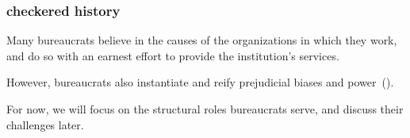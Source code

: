 \documentclass[presentation]{subfiles}
\begin{document}
\begin{frame}\frametitle{checkered history}



Many bureaucrats believe in the causes of the organizations in which they work, and
do so with an earnest effort to provide the institution's services.

However, bureaucrats also instantiate and reify prejudicial biases and power~(\cite{corbett2017algorithmic}).

For now, we will focus on the structural roles bureaucrats serve, and discuss their challenges later.

\end{frame}




\end{document}
